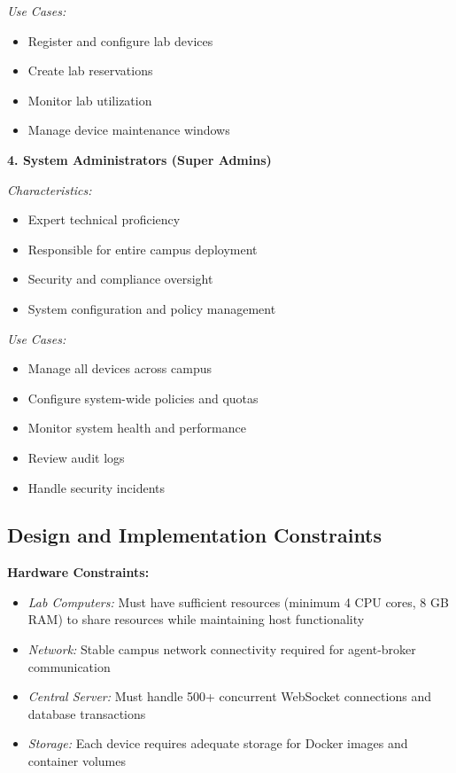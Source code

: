 \documentclass[12pt,a4paper]{article}
\begin{document}
\textit{Use Cases:}
\begin{itemize}
    \item Register and configure lab devices
    \item Create lab reservations
    \item Monitor lab utilization
    \item Manage device maintenance windows
\end{itemize}

\textbf{4. System Administrators (Super Admins)}

\textit{Characteristics:}
\begin{itemize}
    \item Expert technical proficiency
    \item Responsible for entire campus deployment
    \item Security and compliance oversight
    \item System configuration and policy management
\end{itemize}

\textit{Use Cases:}
\begin{itemize}
    \item Manage all devices across campus
    \item Configure system-wide policies and quotas
    \item Monitor system health and performance
    \item Review audit logs
    \item Handle security incidents
\end{itemize}
\subsection{Design and Implementation Constraints}
\label{sec:constraints}

\textbf{Hardware Constraints:}

\begin{itemize}
    \item \textit{Lab Computers:} Must have sufficient resources (minimum 4 CPU cores, 8 GB RAM) to share resources while maintaining host functionality
    \item \textit{Network:} Stable campus network connectivity required for agent-broker communication
    \item \textit{Central Server:} Must handle 500+ concurrent WebSocket connections and database transactions
    \item \textit{Storage:} Each device requires adequate storage for Docker images and container volumes
\end{itemize}
\end{document}
